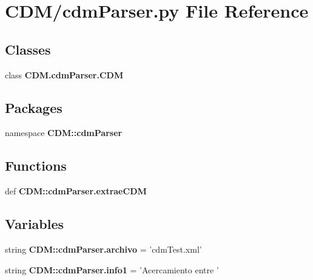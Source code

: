 \section{\-C\-D\-M/cdm\-Parser.py \-File \-Reference}
\label{cdm_parser_8py}
\subsection*{\-Classes}
\begin{DoxyCompactItemize}
\item 
class {\bf \-C\-D\-M.\-cdm\-Parser.\-C\-D\-M}
\end{DoxyCompactItemize}
\subsection*{\-Packages}
\begin{DoxyCompactItemize}
\item 
namespace {\bf \-C\-D\-M\-::cdm\-Parser}
\end{DoxyCompactItemize}
\subsection*{\-Functions}
\begin{DoxyCompactItemize}
\item 
def {\bf \-C\-D\-M\-::cdm\-Parser.\-extrae\-C\-D\-M}
\end{DoxyCompactItemize}
\subsection*{\-Variables}
\begin{DoxyCompactItemize}
\item 
string {\bf \-C\-D\-M\-::cdm\-Parser.\-archivo} = 'cdm\-Test.\-xml'
\item 
string {\bf \-C\-D\-M\-::cdm\-Parser.\-info1} = '\-Acercamiento entre '
\end{DoxyCompactItemize}
